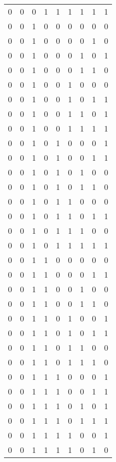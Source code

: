 \begin{longtable}[c]{rrrrrrrrr}
        0 & 0 & 0 & 1 & 1 & 1 & 1 & 1 & 1 \\
        0 & 0 & 1 & 0 & 0 & 0 & 0 & 0 & 0 \\
        0 & 0 & 1 & 0 & 0 & 0 & 0 & 1 & 0 \\
        0 & 0 & 1 & 0 & 0 & 0 & 1 & 0 & 1 \\
        0 & 0 & 1 & 0 & 0 & 0 & 1 & 1 & 0 \\
        0 & 0 & 1 & 0 & 0 & 1 & 0 & 0 & 0 \\
        0 & 0 & 1 & 0 & 0 & 1 & 0 & 1 & 1 \\
        0 & 0 & 1 & 0 & 0 & 1 & 1 & 0 & 1 \\
        0 & 0 & 1 & 0 & 0 & 1 & 1 & 1 & 1 \\
        0 & 0 & 1 & 0 & 1 & 0 & 0 & 0 & 1 \\
        0 & 0 & 1 & 0 & 1 & 0 & 0 & 1 & 1 \\
        0 & 0 & 1 & 0 & 1 & 0 & 1 & 0 & 0 \\
        0 & 0 & 1 & 0 & 1 & 0 & 1 & 1 & 0 \\
        0 & 0 & 1 & 0 & 1 & 1 & 0 & 0 & 0 \\
        0 & 0 & 1 & 0 & 1 & 1 & 0 & 1 & 1 \\
        0 & 0 & 1 & 0 & 1 & 1 & 1 & 0 & 0 \\
        0 & 0 & 1 & 0 & 1 & 1 & 1 & 1 & 1 \\
        0 & 0 & 1 & 1 & 0 & 0 & 0 & 0 & 0 \\
        0 & 0 & 1 & 1 & 0 & 0 & 0 & 1 & 1 \\
        0 & 0 & 1 & 1 & 0 & 0 & 1 & 0 & 0 \\
        0 & 0 & 1 & 1 & 0 & 0 & 1 & 1 & 0 \\
        0 & 0 & 1 & 1 & 0 & 1 & 0 & 0 & 1 \\
        0 & 0 & 1 & 1 & 0 & 1 & 0 & 1 & 1 \\
        0 & 0 & 1 & 1 & 0 & 1 & 1 & 0 & 0 \\
        0 & 0 & 1 & 1 & 0 & 1 & 1 & 1 & 0 \\
        0 & 0 & 1 & 1 & 1 & 0 & 0 & 0 & 1 \\
        0 & 0 & 1 & 1 & 1 & 0 & 0 & 1 & 1 \\
        0 & 0 & 1 & 1 & 1 & 0 & 1 & 0 & 1 \\
        0 & 0 & 1 & 1 & 1 & 0 & 1 & 1 & 1 \\
        0 & 0 & 1 & 1 & 1 & 1 & 0 & 0 & 1 \\
        0 & 0 & 1 & 1 & 1 & 1 & 0 & 1 & 0 \\

\end{longtable}
